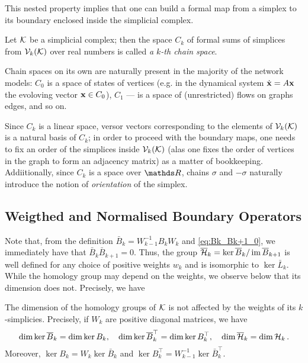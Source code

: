 This nested property implies that one can build a formal map from a simplex to its boundary enclosed inside the simplicial complex. 

\begin{definition}
      Let \( \mathcal{K} \) be a simplicial complex; then the space \( C_k \) of formal sums of simplices from \( \mathcal{V}_{k}(\mathcal{K}) \) over real numbers is called \emph{a \( k\)-th chain space}.
\end{definition}

Chain spaces on its own are naturally present in the majority of the network models: \( C_0 \) is a space of states of vertices (e.g. in the dynamical system \( \dot{ \mathbf{x} } = A \mathbf{x} \) the evoloving vector \( \mathbf{x} \in C_0 \)), \( C_1 \) --- is a space of (unrestricted) flows on graphs edges, and so on.

Since \( C_k \) is a linear space, versor vectors corresponding to the elements of \( \mathcal{V}_{k}(\mathcal{K})\) is a natural basis of \( C_k \); in order to proceed with the boundary maps, one needs to fix an order of the simplices inside \( \mathcal{V}_{k}(\mathcal{K}) \) (alas one fixes the order of vertices in the graph to form an adjacency matrix) as a matter of bookkeeping. Addiitionally, since \( C_k \) is a space over \( \ds R \), chains \( \sigma \) and \( - \sigma \) naturally introduce the notion of \emph{orientation} of the simplex.













\subsection{ Weigthed and Normalised Boundary Operators}


Note that, from the definition \( \bar B_k= W_{k-1}^{-1} B_k W_k \) and \eqref{eq:Bk_Bk+1_0}, we immediately have that  \( \bar B_k\bar B_{k+1}=0 \). Thus, the group \( \overline{\mathcal{H}}_k = \ker \overline{B}_k / \operatorname{im} \overline{B}_{k+1} \) is well defined for any choice of positive weights  \( w_k \) and is isomorphic to \( \ker \bar L_k \). While the homology group may depend on the weights,  we observe below that its dimension does not. Precisely, we have 
\begin{proposition}
 \label{thm:wHomGroup}
     The dimension of the homology groups of \( \mathcal{K} \) is not affected by the weights of its \( k \)-simplicies. Precisely, if \( W_k \) are positive diagonal matrices, we have
     \begin{equation}
         \dim \ker \overline{B}_k = \dim \ker B_k, \quad \dim \ker \overline{B}_k^\top = \dim \ker B_k^\top, \quad \dim \overline{\mathcal{H}}_k = \dim \mathcal{H}_k\, .
     \end{equation}
     Moreover, \( \ker B_k = W_k \ker \bar B_k \) and \( \ker B_k^\top = W_{k-1}^{-1} \ker \bar B_k^\top \).
\end{proposition}

